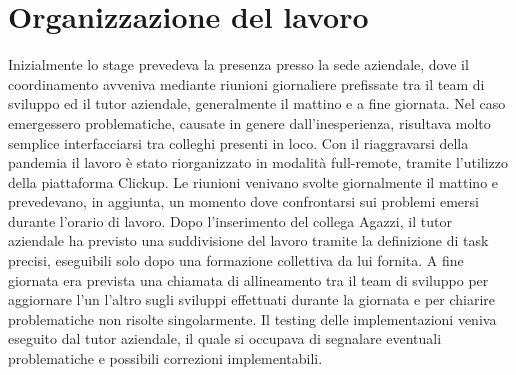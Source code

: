 \section{Organizzazione del lavoro}
Inizialmente lo stage prevedeva la presenza presso la sede aziendale, dove il coordinamento avveniva mediante riunioni giornaliere prefissate tra il team di sviluppo ed il tutor aziendale, generalmente il mattino e a fine giornata. Nel caso emergessero problematiche, causate in genere dall'inesperienza, risultava molto semplice interfacciarsi tra colleghi presenti in loco. Con il riaggravarsi della pandemia il lavoro è stato riorganizzato in modalità full-remote, tramite l'utilizzo della piattaforma Clickup. Le riunioni venivano svolte giornalmente il mattino e prevedevano, in aggiunta, un momento dove confrontarsi sui problemi emersi durante l'orario di lavoro. Dopo l'inserimento del collega Agazzi, il tutor aziendale ha previsto una suddivisione del lavoro tramite la definizione di task precisi, eseguibili solo dopo una formazione collettiva da lui fornita. A fine giornata era prevista una chiamata di allineamento tra il team di sviluppo per aggiornare l'un l'altro sugli sviluppi effettuati durante la giornata e per chiarire problematiche non risolte singolarmente. Il testing delle implementazioni veniva eseguito dal tutor aziendale, il quale si occupava di segnalare eventuali problematiche e possibili correzioni implementabili.
